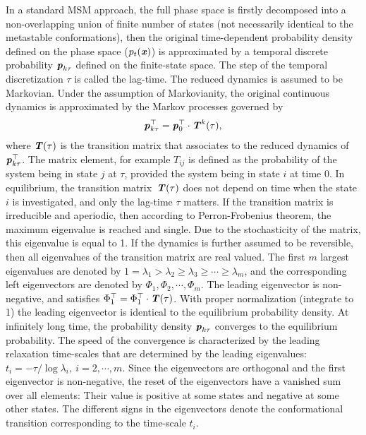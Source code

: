 \documentclass[epjST]{svjour}
\newcommand{\vect}[1]{\textbf{\textit{#1}}}
\begin{document}
In a standard MSM approach, the full phase space is firstly decomposed into a non-overlapping union of finite number of states
(not necessarily identical to the metastable conformations),
then
the original time-dependent probability density defined on the phase
space ($p_t(\vect x)$) is approximated by a temporal discrete probability $\vect p_{k\tau}$ defined on the finite-state space.
The step of the temporal discretization $\tau$ is called the lag-time.
The reduced
dynamics is assumed to be Markovian.
Under the assumption of Markovianity, the original continuous dynamics is approximated by the Markov processes governed by
\begin{align}
\vect p^\top_{k\tau} = \vect p^\top_0 \cdot \vect T^k(\tau),
\end{align}
where $\vect T(\tau)$ is the transition matrix that
associates to the reduced dynamics of $\vect p^\top_{k\tau}$. The matrix element, for example $T_{ij}$
is defined as the probability of the system being in state
$j$ at $\tau$,  provided the system being in state $i$ at time 0.
In equilibrium, the transition matrix~$\vect T(\tau)$ does not depend on time when the state $i$ is investigated, and only the
lag-time $\tau$ matters.
If the transition matrix is irreducible and aperiodic, then according to Perron-Frobenius theorem, the maximum
eigenvalue is reached and single. Due to the stochasticity of the matrix, this eigenvalue is equal to 1.
If the dynamics
is further assumed to be reversible, then all eigenvalues of the transition matrix are
real valued.
The first $m$ largest eigenvalues are denoted by $1 = \lambda_1 > \lambda_2 \geq \lambda_3 \geq \cdots \geq \lambda_m$, and
the corresponding left eigenvectors are denoted by $\Phi_1, \Phi_2, \cdots, \Phi_m$.
The leading eigenvector is non-negative, and satisfies $\Phi^\top_1 = \Phi^\top_1\cdot\vect T(\tau)$.
With proper normalization (integrate to 1) the leading eigenvector is identical to the 
equilibrium probability density.
At infinitely long time, the probability density $\vect p_{k\tau}$ converges to the equilibrium probability.
The speed of the convergence is characterized by the leading relaxation time-scales that are
determined by the leading eigenvalues:  $t_i  = -{\tau}/{\log\lambda_i}, \ i=2, \cdots, m$.
Since the eigenvectors are orthogonal and the first eigenvector is non-negative, the reset
of the eigenvectors have a vanished sum over all elements: Their
value is positive at some states and negative at some other states.
The different signs in the eigenvectors denote the conformational transition corresponding to the
time-scale $t_i$.
\end{document}
